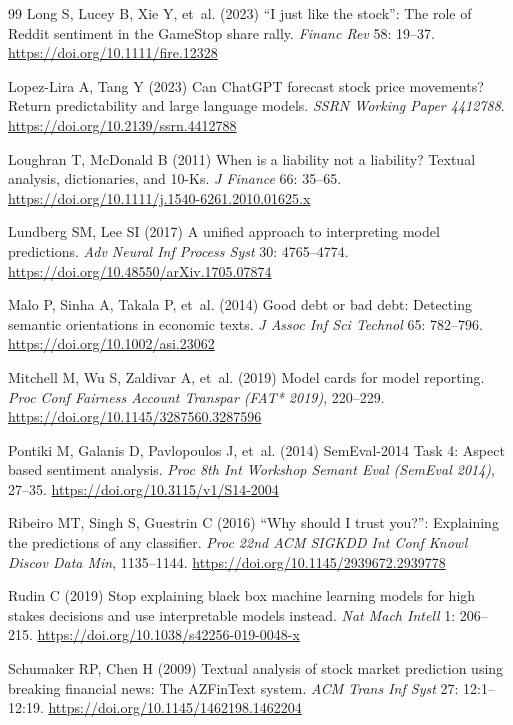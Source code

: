 \documentclass[12pt,a4paper]{article}
\begin{document}
\begin{thebibliography}{99}
Long S, Lucey B, Xie Y, et~al. (2023) ``I just like the stock'': The role of Reddit
sentiment in the GameStop share rally. \emph{Financ Rev} 58: 19--37. \url{https://doi.org/10.1111/fire.12328}

Lopez-Lira A, Tang Y (2023) Can ChatGPT forecast stock price movements? Return
predictability and large language models. \emph{SSRN Working Paper 4412788}. \url{https://doi.org/10.2139/ssrn.4412788}

Loughran T, McDonald B (2011) When is a liability not a liability? Textual analysis,
dictionaries, and 10-Ks. \emph{J Finance} 66: 35--65. \url{https://doi.org/10.1111/j.1540-6261.2010.01625.x}

Lundberg SM, Lee SI (2017) A unified approach to interpreting model predictions.
\emph{Adv Neural Inf Process Syst} 30: 4765--4774. \url{https://doi.org/10.48550/arXiv.1705.07874}

Malo P, Sinha A, Takala P, et~al. (2014) Good debt or bad debt: Detecting semantic
orientations in economic texts. \emph{J Assoc Inf Sci Technol} 65: 782--796. \url{https://doi.org/10.1002/asi.23062}

Mitchell M, Wu S, Zaldivar A, et~al. (2019) Model cards for model reporting.
\emph{Proc Conf Fairness Account Transpar (FAT* 2019)}, 220--229. \url{https://doi.org/10.1145/3287560.3287596}

Pontiki M, Galanis D, Pavlopoulos J, et~al. (2014) SemEval-2014 Task 4: Aspect based
sentiment analysis. \emph{Proc 8th Int Workshop Semant Eval (SemEval 2014)}, 27--35. \url{https://doi.org/10.3115/v1/S14-2004}

Ribeiro MT, Singh S, Guestrin C (2016) ``Why should I trust you?'': Explaining the
predictions of any classifier. \emph{Proc 22nd ACM SIGKDD Int Conf Knowl Discov Data
Min}, 1135--1144. \url{https://doi.org/10.1145/2939672.2939778}

Rudin C (2019) Stop explaining black box machine learning models for high stakes
decisions and use interpretable models instead. \emph{Nat Mach Intell} 1: 206--215. \url{https://doi.org/10.1038/s42256-019-0048-x}

Schumaker RP, Chen H (2009) Textual analysis of stock market prediction using
breaking financial news: The AZFinText system. \emph{ACM Trans Inf Syst} 27:
12:1--12:19. \url{https://doi.org/10.1145/1462198.1462204}


\end{thebibliography}
\end{document}
